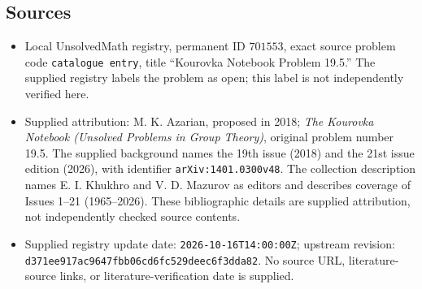 \documentclass[11pt]{article}
\begin{document}
\subsection{Sources}
\begin{itemize}
\item Local UnsolvedMath registry, permanent ID \(701553\), exact source problem code \texttt{catalogue entry}, title ``Kourovka Notebook Problem 19.5.'' The supplied registry labels the problem as open; this label is not independently verified here.
\item Supplied attribution: M. K. Azarian, proposed in 2018; \emph{The Kourovka Notebook (Unsolved Problems in Group Theory)}, original problem number 19.5. The supplied background names the 19th issue (2018) and the 21st issue edition (2026), with identifier \texttt{arXiv:1401.0300v48}. The collection description names E. I. Khukhro and V. D. Mazurov as editors and describes coverage of Issues 1--21 (1965--2026). These bibliographic details are supplied attribution, not independently checked source contents.
\item Supplied registry update date: \texttt{2026-10-16T14:00:00Z}; upstream revision: \texttt{d371ee917ac9647fbb06cd6fc529deec6f3dda82}. No source URL, literature-source links, or literature-verification date is supplied.
\end{itemize}
\end{document}
